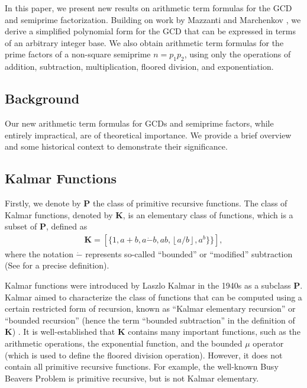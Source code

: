 \documentclass[11pt,reqno]{article}
\theoremstyle{plain}
\theoremstyle{definition}
\newcommand{\floor}[1]{\left\lfloor #1 \right\rfloor}
\begin{document}
In this paper, we present new results on arithmetic term formulas for the GCD and semiprime factorization. Building on work by Mazzanti and Marchenkov \cite{mazzanti2002plainbases, marchenkov1980superposition}, we derive a simplified polynomial form for the GCD that can be expressed in terms of an arbitrary integer base. We also obtain arithmetic term formulas for the prime factors of a non-square semiprime $n=p_1 p_2$, using only the operations of addition, subtraction, multiplication, floored division, and exponentiation.

\subsection{Background}
Our new arithmetic term formulas for GCDs and semiprime factors, while entirely impractical, are of theoretical importance. We provide a brief overview and some historical context to demonstrate their significance.

\subsection{Kalmar Functions} \label{subsection:kalmar}
Firstly, we denote by $\textbf{P}$ the class of primitive recursive functions. The class of Kalmar functions, denoted by $\textbf{K}$, is an elementary class of functions, which is a subset of $\textbf{P}$, defined as
\begin{align*}
    \textbf{K} = [\{ 1, a+b, a\Dot{-}b, ab, \floor{a/b}, a^b \} \}],
\end{align*}
where the notation $\Dot{-}$ represents so-called ``bounded'' or ``modified'' subtraction (See \cite{mazzanti2002plainbases} for a precise definition).

Kalmar functions were introduced by Laszlo Kalmar in the 1940s as a subclass \textbf{P}. Kalmar aimed to characterize the class of functions that can be computed using a certain restricted form of recursion, known as ``Kalmar elementary recursion'' or ``bounded recursion'' (hence the term ``bounded subtraction'' in the definition of $\textbf{K}$) \cite{herman1969elementary}. It is well-established that $\textbf{K}$ contains many important functions, such as the arithmetic operations, the exponential function, and the bounded $\mu$ operator (which is used to define the floored division operation). However, it does not contain all primitive recursive functions. For example, the well-known Busy Beavers Problem is primitive recursive, but is not Kalmar elementary.
\end{document}
